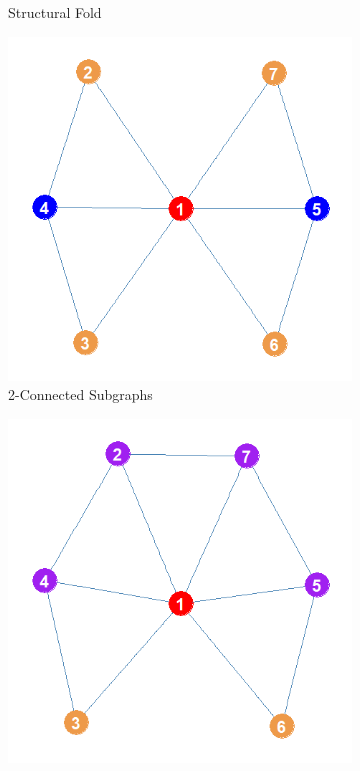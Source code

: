 \documentclass[12pt]{article}
\begin{document}
\begin{figure}
\begin{subfigure}[b]{0.35\textwidth}
            \caption{Structural Fold}
            \label{fig:sf}
    \end{subfigure}
    \begin{subfigure}[b]{0.35\textwidth}
        \includegraphics[width=1.0\textwidth]{Plots/intra.png}
            \caption{2-Connected Subgraphs}
            \label{fig:intra}
    \end{subfigure}
    \begin{subfigure}[b]{0.35\textwidth}
        \includegraphics[width=1.0\textwidth]{Plots/inter.png}

\end{subfigure}
\end{figure}
\end{document}
